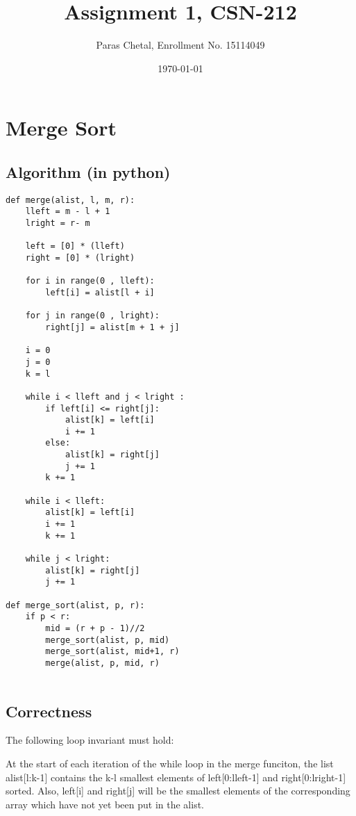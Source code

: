 \documentclass{article}
\title{\textbf{Assignment 1, CSN-212}}
\author{Paras Chetal, Enrollment No. 15114049}
\date{\today}
\begin{document}
\maketitle



\section{Merge Sort}
\subsection{Algorithm (in python)}


\begin{lstlisting}
def merge(alist, l, m, r):
    lleft = m - l + 1
    lright = r- m
 
    left = [0] * (lleft)
    right = [0] * (lright)
 
    for i in range(0 , lleft):
        left[i] = alist[l + i]
 
    for j in range(0 , lright):
        right[j] = alist[m + 1 + j]

    i = 0     
    j = 0     
    k = l     
 
    while i < lleft and j < lright :
        if left[i] <= right[j]:
            alist[k] = left[i]
            i += 1
        else:
            alist[k] = right[j]
            j += 1
        k += 1

    while i < lleft:
        alist[k] = left[i]
        i += 1
        k += 1
     
    while j < lright:
        alist[k] = right[j]
        j += 1

def merge_sort(alist, p, r):
    if p < r:
        mid = (r + p - 1)//2
        merge_sort(alist, p, mid)
        merge_sort(alist, mid+1, r)
        merge(alist, p, mid, r)
        
\end{lstlisting}

\subsection{Correctness}
The following loop invariant must hold:

At the start of each iteration of the while loop in the merge funciton, the list alist[l:k-1] contains the k-l smallest elements of left[0:lleft-1] and right[0:lright-1] sorted. Also, left[i] and right[j] will be the smallest elements of the corresponding array which have not yet been put in the alist.
\end{document}
